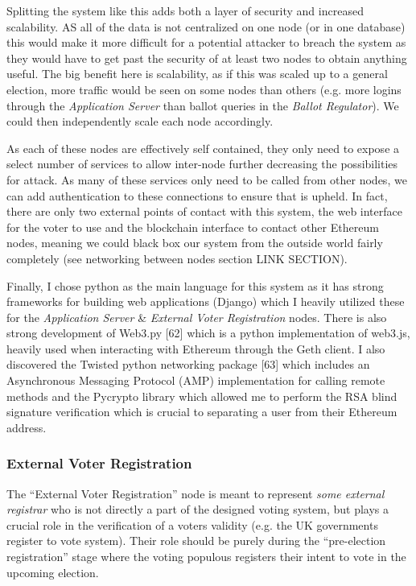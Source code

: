 \documentclass{article}
\begin{document}
Splitting the system like this adds both a layer of security and increased scalability. AS all of the data is not centralized on one node (or in one database) this would make it more difficult for a potential attacker to breach the system as they would have to get past the security of at least two nodes to obtain anything useful. The big benefit here is scalability, as if this was scaled up to a general election, more traffic would be seen on some nodes than others (e.g. more logins through the \textit{Application Server} than ballot queries in the \textit{Ballot Regulator}). We could then independently scale each node accordingly.

As each of these nodes are effectively self contained, they only need to expose a select number of services to allow inter-node further decreasing the possibilities for attack. As many of these services only need to be called from other nodes, we can add authentication to these connections to ensure that is upheld. In fact, there are only two external points of contact with this system, the web interface for the voter to use and the blockchain interface to contact other Ethereum nodes, meaning we could black box our system from the outside world fairly completely (see networking between nodes section {\Large LINK SECTION}).

Finally, I chose python as the main language for this system as it has strong frameworks for building web applications (Django) which I heavily utilized these for the \textit{Application Server} \& \textit{External Voter Registration} nodes. There is also strong development of Web3.py {\Large [62]} which is a python implementation of web3.js, heavily used when interacting with Ethereum through the Geth client. I also discovered the Twisted python networking package {\Large [63]} which includes an Asynchronous Messaging Protocol (AMP) implementation for calling remote methods and the Pycrypto library which allowed me to perform the RSA blind signature verification which is crucial to separating a user from their Ethereum address.

\subsubsection{External Voter Registration}
The ``External Voter Registration'' node is meant to represent \textit{some external registrar} who is not directly a part of the designed voting system, but plays a crucial role in the verification of a voters validity (e.g. the UK governments register to vote system). Their role should be purely during the ``pre-election registration'' stage where the voting populous registers their intent to vote in the upcoming election. 
\end{document}
